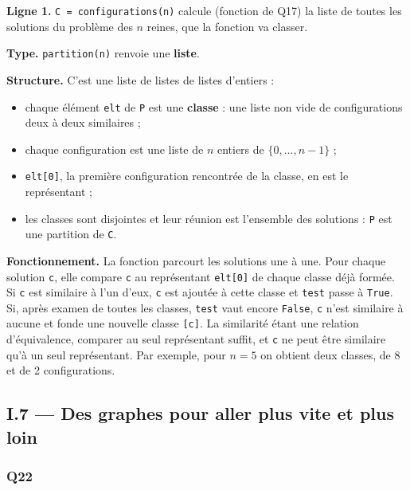 \documentclass[11pt,a4paper]{article}
\providecommand{\tightlist}{\setlength{\itemsep}{0pt}\setlength{\parskip}{0pt}}
\begin{document}
\textbf{Ligne 1.} \texttt{C\ =\allowbreak{}\ configurations(\allowbreak{}n)\allowbreak{}} calcule (fonction de Q17) la liste de toutes les solutions du problème des \(n\) reines, que la fonction va classer.

\textbf{Type.} \texttt{partition(n)} renvoie une \textbf{liste}.

\textbf{Structure.} C'est une liste de listes de listes d'entiers :

\begin{itemize}
\tightlist
\item
  chaque élément \texttt{elt} de \texttt{P} est une \textbf{classe} : une liste non vide de configurations deux à deux similaires ;
\item
  chaque configuration est une liste de \(n\) entiers de \(\{0, \dots, n-1\}\) ;
\item
  \texttt{elt{[}0{]}}, la première configuration rencontrée de la classe, en est le représentant ;
\item
  les classes sont disjointes et leur réunion est l'ensemble des solutions : \texttt{P} est une partition de \texttt{C}.
\end{itemize}

\textbf{Fonctionnement.} La fonction parcourt les solutions une à une. Pour chaque solution \texttt{c}, elle compare \texttt{c} au représentant \texttt{elt{[}0{]}} de chaque classe déjà formée. Si \texttt{c} est similaire à l'un d'eux, \texttt{c} est ajoutée à cette classe et \texttt{test} passe à \texttt{True}. Si, après examen de toutes les classes, \texttt{test} vaut encore \texttt{False}, \texttt{c} n'est similaire à aucune et fonde une nouvelle classe \texttt{{[}c{]}}. La similarité étant une relation d'équivalence, comparer au seul représentant suffit, et \texttt{c} ne peut être similaire qu'à un seul représentant. Par exemple, pour \(n = 5\) on obtient deux classes, de 8 et de 2 configurations.

\hypertarget{i.7-des-graphes-pour-aller-plus-vite-et-plus-loin}{%
\subsection{I.7 --- Des graphes pour aller plus vite et plus loin}\label{i.7-des-graphes-pour-aller-plus-vite-et-plus-loin}}

\hypertarget{q22}{%
\subsubsection{Q22}\label{q22}}
\end{document}
